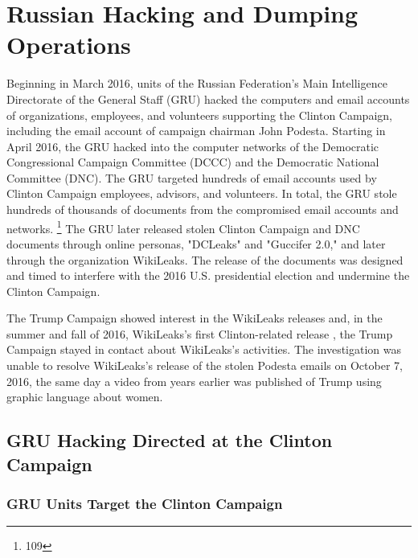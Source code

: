 \section{Russian Hacking and Dumping Operations}

Beginning in March 2016, units of the Russian Federation's Main Intelligence Directorate of the General Staff (GRU) hacked the computers and email accounts of organizations, employees, and volunteers supporting the Clinton Campaign, including the email account of campaign chairman John Podesta.
Starting in April 2016, the GRU hacked into the computer networks of the Democratic Congressional Campaign Committee (DCCC) and the Democratic National Committee (DNC).
The GRU targeted hundreds of email accounts used by Clinton Campaign employees, advisors, and volunteers.
In total, the GRU stole hundreds of thousands of documents from the compromised email accounts and networks.%
\footnote{109}
The GRU later released stolen Clinton Campaign and DNC documents through online personas, "DCLeaks" and "Guccifer 2.0," and later through the organization WikiLeaks.
The release of the documents was designed and timed to interfere with the 2016 U.S. presidential election and undermine the Clinton Campaign.

The Trump Campaign showed interest in the WikiLeaks releases and, in the summer and fall of 2016, 
WikiLeaks's first Clinton-related release , the Trump Campaign stayed in contact  about WikiLeaks's activities.
The investigation was unable to resolve 
WikiLeaks's release of the stolen Podesta emails on October 7, 2016, the same day a video from years earlier was published of Trump using graphic language about women.

\subsection{GRU Hacking Directed at the Clinton Campaign}

\subsubsection{GRU Units Target the Clinton Campaign}


